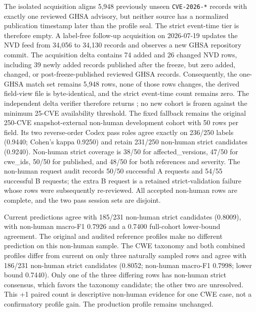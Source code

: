 The isolated acquisition aligns 5,948 previously unseen \texttt{CVE-2026-*} records with exactly one reviewed GHSA advisory, but neither source has a normalized publication timestamp later than the profile seal. The strict event-time tier is therefore empty. A label-free follow-up acquisition on 2026-07-19 updates the NVD feed from 34,056 to 34,130 records and observes a new GHSA repository commit. The acquisition delta contains 74 added and 26 changed NVD rows, including 39 newly added records published after the freeze, but zero added, changed, or post-freeze-published reviewed GHSA records. Consequently, the one-GHSA match set remains 5,948 rows, none of those rows changes, the derived field-view file is byte-identical, and the strict event-time count remains zero. The independent delta verifier therefore returns ; no new cohort is frozen against the minimum 25-CVE availability threshold. The fixed fallback remains the original 250-CVE snapshot-external non-human development cohort with 50 rows per field. Its two reverse-order Codex pass roles agree exactly on 236/250 labels (0.9440; Cohen's kappa 0.9250) and retain 231/250 non-human strict candidates (0.9240). Non-human strict coverage is 38/50 for affected\_versions, 47/50 for cwe\_ids, 50/50 for published, and 48/50 for both references and severity. The non-human request audit records 50/50 successful A requests and 54/55 successful B requests; the extra B request is a retained strict-validation failure whose rows were subsequently re-reviewed. All accepted non-human rows are complete, and the two pass session sets are disjoint.

Current predictions agree with 185/231 non-human strict candidates (0.8009), with non-human macro-F1 0.7926 and a 0.7400 full-cohort lower-bound agreement. The original and audited reference profiles make no different prediction on this non-human sample. The CWE taxonomy and both combined profiles differ from current on only three naturally sampled rows and agree with 186/231 non-human strict candidates (0.8052; non-human macro-F1 0.7998; lower bound 0.7440). Only one of the three differing rows has non-human strict consensus, which favors the taxonomy candidate; the other two are unresolved. This +1 paired count is descriptive non-human evidence for one CWE case, not a confirmatory profile gain. The production profile remains unchanged.

